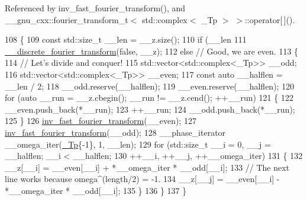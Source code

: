Referenced by inv\+\_\+fast\+\_\+fourier\+\_\+transform(), and \+\_\+\+\_\+gnu\+\_\+cxx\+::fourier\+\_\+transform\+\_\+t$<$ std\+::complex$<$ \+\_\+\+Tp $>$ $>$\+::operator\mbox{[}$\,$\mbox{]}().


\begin{DoxyCode}
108     \{
109       \textcolor{keyword}{const} std::size\_t \_\_len = \_\_z.size();
110       \textcolor{keywordflow}{if} (\_\_len %
111         \hyperlink{namespace____gnu__cxx_a6dff31b609fa2f8678c729d557dbae49}{\_\_discrete\_fourier\_transform}(\textcolor{keyword}{false}, \_\_z);
112       \textcolor{keywordflow}{else} \textcolor{comment}{// Good, we are even.}
113         \{
114           \textcolor{comment}{// Let's divide and conquer!}
115           std::vector<std::complex<\_Tp>> \_\_odd;
116           std::vector<std::complex<\_Tp>> \_\_even;
117           \textcolor{keyword}{const} \textcolor{keyword}{auto} \_\_halflen = \_\_len / 2;
118           \_\_odd.reserve(\_\_halflen);
119           \_\_even.reserve(\_\_halflen);
120           \textcolor{keywordflow}{for} (\textcolor{keyword}{auto} \_\_run = \_\_z.cbegin(); \_\_run != \_\_z.cend(); ++\_\_run)
121             \{
122               \_\_even.push\_back(*\_\_run);
123               ++\_\_run;
124               \_\_odd.push\_back(*\_\_run);
125             \}
126           \hyperlink{namespace____gnu__cxx_a96b56c927599a614656027d3ab4b82ac}{inv\_fast\_fourier\_transform}(\_\_even);
127           \hyperlink{namespace____gnu__cxx_a96b56c927599a614656027d3ab4b82ac}{inv\_fast\_fourier\_transform}(\_\_odd);
128           \_\_phase\_iterator \_\_omega\_iter(\hyperlink{namespace____gnu__cxx_a3b19a9c800ca194374ef9172290f7d79}{\_Tp}\{-1\}, 1, \_\_len);
129           \textcolor{keywordflow}{for} (std::size\_t \_\_i = 0, \_\_j = \_\_halflen; \_\_i < \_\_halflen;
130                 ++\_\_i, ++\_\_j, ++\_\_omega\_iter)
131             \{
132               \_\_z[\_\_i] = \_\_even[\_\_i] + *\_\_omega\_iter * \_\_odd[\_\_i];
133               \textcolor{comment}{// The next line works because omega^(length/2) = -1.}
134               \_\_z[\_\_j] = \_\_even[\_\_i] - *\_\_omega\_iter * \_\_odd[\_\_i];
135             \}
136         \}
137     \}
\end{DoxyCode}
\mbox{\label{namespace____gnu__cxx_a1fe4b25c379855d94a657b688a327e80}} 
